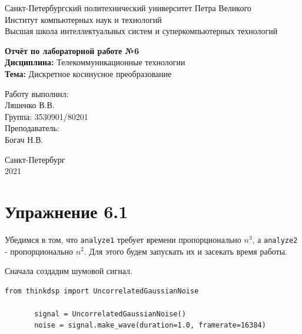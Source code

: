 \documentclass[a4paper,12pt]{report}
\begin{document}
 

\begin{titlepage}
\newpage
	\begin{center}
		\large Санкт-Петербургский политехнический университет Петра Великого\\
		Институт компьютерных наук и технологий\\
		Высшая школа интеллектуальных систем и суперкомпьютерных технологий\\
	\end{center}
\vspace{7cm}

\begin{center}
		\large \textbf{Отчёт по лабораторной работе №6} \\
		\textbf{Дисциплина:} Телекоммуникационные технологии\\
		\textbf{Тема:} Дискретное косинусное преобразование
\end{center}
\vspace{4cm}
	
\begin{flushright}
		\large Работу выполнил:\\ Ляшенко В.В.\\
		Группа: 3530901/80201\\
		Преподаватель:\\ Богач Н.В.
\end{flushright}

\vspace{\fill}
\begin{center}
	\large Санкт-Петербург\\ 2021
	\end{center}
\end{titlepage}

\tableofcontents
\listoffigures
\lstlistoflistings

\chapter{Упражнение 6.1}
    Убедимся в том, что \texttt{analyze1} требует времени пропорционально $n^3$, а \texttt{analyze2} - пропорционально $n^2$. Для этого будем запускать их и засекать время работы. 
    
    Сначала создадим шумовой сигнал.
\begin{lstlisting}[caption=Создание шумового сигнала]
       from thinkdsp import UncorrelatedGaussianNoise

       signal = UncorrelatedGaussianNoise()
       noise = signal.make_wave(duration=1.0, framerate=16384)
\end{lstlisting}    
\end{document}
